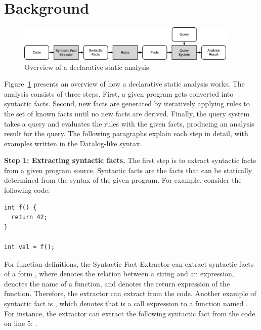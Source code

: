 \section{Background}\label{sec:background}
\begin{figure}[t]
  \centering
  \vspace{2mm}
  \includegraphics[width=0.94\textwidth]{img/ov1.pdf}
  \caption{Overview of a declarative static analysis}
  \label{fig:ov1}
\end{figure}

Figure~\ref{fig:ov1} presents an overview of how a declarative static analysis
works.  The analysis consists of three steps.  First, a given program gets
converted into syntactic facts.  Second, new facts are generated by iteratively
applying rules to the set of known facts until no new facts are derived.
Finally, the query system takes a query and evaluates the rules with the given
facts, producing an analysis result for the query.  The following paragraphs
explain each step in detail, with examples written in the Datalog-like syntax.

\textbf{Step 1: Extracting syntactic facts.}
The first step is to extract syntactic facts from a given program source.
Syntactic facts are the facts that can be statically determined from the syntax
of the given program.  For example, consider the following code:

\begin{lstlisting}[style=mcpp]
int f() {
  return 42;
}

int val = f();
\end{lstlisting}

For function definitions, the Syntactic Fact Extractor can extract syntactic
facts of a form , where 
denotes the relation between a string and an expression, 
denotes the name of a function, and  denotes the return
expression of the function.  Therefore, the extractor can extract  from the code.  Another example of syntactic fact is , which denotes that  is a call
expression to a function named .  For instance, the
extractor can extract the following syntactic fact from the code on line 5:
.

